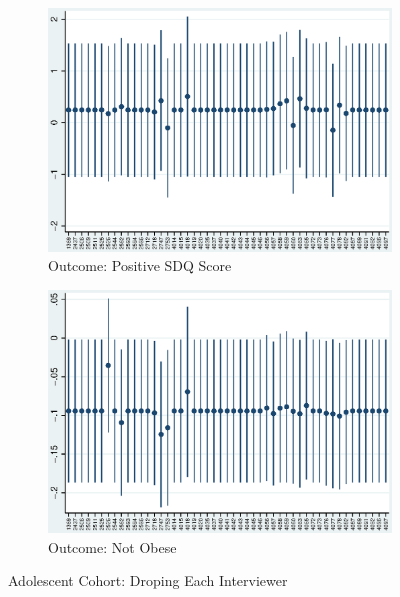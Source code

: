     \begin{figure}[H]
      \centering
        \begin{subfigure}[t]{0.81\textwidth}
          \includegraphics[width=\textwidth]{../../../output/image/coef-interviewer-adol-pos_childSDQ_score.eps}       
\caption{Outcome: Positive SDQ Score}        
        \end{subfigure}
        \begin{subfigure}[t]{0.81\textwidth}
          \includegraphics[width=\textwidth]{../../../output/image/coef-interviewer-adol-BMI_obese.eps}       
 \caption{Outcome: Not Obese}        
        \end{subfigure}
      \caption{Adolescent Cohort: Droping Each Interviewer}  \label{fig:adol-sensitivity-interviewer}
    \end{figure}


